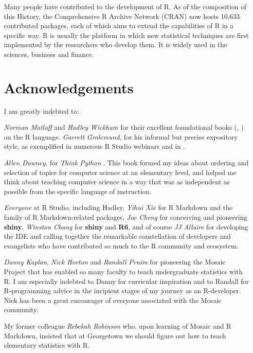 \documentclass[]{book}
\theoremstyle{definition}
\theoremstyle{definition}
\theoremstyle{definition}
\theoremstyle{remark}
\begin{document}
Many people have contributed to the development of R. As of the
composition of this History, the Comprehensive R Archive Network (CRAN)
now hosts 10,633 contributed packages, each of which aims to extend the
capabilities of R in a specific way. R is usually the platform in which
new statistical techniques are first implemented by the researchers who
develop them. It is widely used in the sciences, business and finance.

\section{Acknowledgements}\label{acknowledgements}

I am greatly indebted to:

\emph{Norman Matloff} and \emph{Hadley Wickham} for their excellent
foundational books (\citep{Matloff2011}, \citep{Wickham2014}) on the R
language. \emph{Garrett Grolemund}, for his informal but precise
expository style, as exemplified in numerous R Studio webinars and in
\citep{Grolemund2014}.

\emph{Allen Downey}, for \emph{Think Python} \citep{Downey2015}. This
book formed my ideas about ordering and selection of topics for computer
science at an elementary level, and helped me think about teaching
computer science in a way that was as independent as possible from the
specific language of instruction.

\emph{Everyone} at R Studio, including Hadley, \emph{Yihui Xie} for R
Markdown and the family of R Markdown-related packages, \emph{Joe Cheng}
for conceiving and pioneering \textbf{shiny}, \emph{Winston Chang} for
\textbf{shiny} and \textbf{R6}, and of course \emph{JJ Allaire} for
developing the IDE and calling together the remarkable constellation of
developers and evangelists who have contributed so much to the R
community and ecosystem.

\emph{Danny Kaplan}, \emph{Nick Horton} and \emph{Randall Pruim} for
pioneering the Mosaic Project that has enabled so many faculty to teach
undergraduate statistics with R. I am especially indebted to Danny for
curricular inspiration and to Randall for R-programming advice in the
incipient stages of my journey as an R-developer. Nick has been a great
encourager of everyone associated with the Mosaic community.

My former colleague \emph{Rebekah Robinson} who, upon learning of Mosaic
and R Markdown, insisted that at Georgetown we should figure out how to
teach elementary statistics with R.
\end{document}
